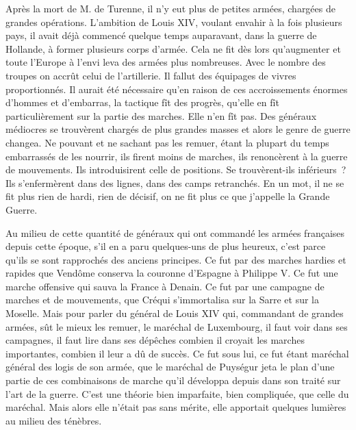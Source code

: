 \documentclass[french,twoside]{book} %
\begin{document}
Après la mort de M. de Turenne, il n’y eut plus de petites armées, chargées de grandes opérations. L’ambition de Louis XIV, voulant envahir à la fois plusieurs pays, il avait déjà commencé quelque temps auparavant, dans la guerre de Hollande, à former plusieurs corps d’armée. Cela ne fit dès lors qu’augmenter et toute l’Europe à l’envi leva des armées plus nombreuses. Avec le nombre des troupes on accrût celui de l’artillerie. Il fallut des équipages de vivres proportionnés. Il aurait été nécessaire qu’en raison de ces accroissements énormes d’hommes et d’embarras, la tactique fît des progrès, qu’elle en fît particulièrement sur la partie des marches. Elle n’en fît pas. Des généraux médiocres se trouvèrent chargés de plus grandes masses et alors le genre de guerre changea. Ne pouvant et ne sachant pas les remuer, étant la plupart du temps embarrassés de les nourrir, ils firent moins de marches, ils renoncèrent à la guerre de mouvements. Ils introduisirent celle de positions. Se trouvèrent-ils inférieurs ? Ils s’enfermèrent dans des lignes, dans des camps retranchés. En un mot, il ne se fit plus rien de hardi, rien de décisif, on ne fit plus ce que j’appelle la Grande Guerre.\par
Au milieu de cette quantité de généraux qui ont commandé les armées françaises depuis cette époque, s’il en a paru quelques-uns de plus heureux, c’est parce qu’ils se sont rapprochés des anciens principes. Ce fut par des marches hardies et rapides que Vendôme conserva la couronne d’Espagne à Philippe V. Ce fut une marche offensive qui sauva la France à Denain. Ce fut par une campagne de marches et de mouvements, que Créqui s’immortalisa sur la Sarre et sur la Moselle. Mais pour parler du général de Louis XIV qui, commandant de grandes armées, sût le mieux les remuer, le maréchal de Luxembourg, il faut voir dans ses campagnes, il faut lire dans ses dépêches combien il croyait les marches importantes, combien il leur a dû de succès. Ce fut sous lui, ce fut étant maréchal général des logis de son armée, que le maréchal de Puységur jeta le plan d’une partie de ces combinaisons de marche qu’il développa depuis dans son traité sur l’art de la guerre. C’est une théorie bien imparfaite, bien compliquée, que celle du maréchal. Mais alors elle n’était pas sans mérite, elle apportait quelques lumières au milieu des ténèbres.\par
\end{document}
